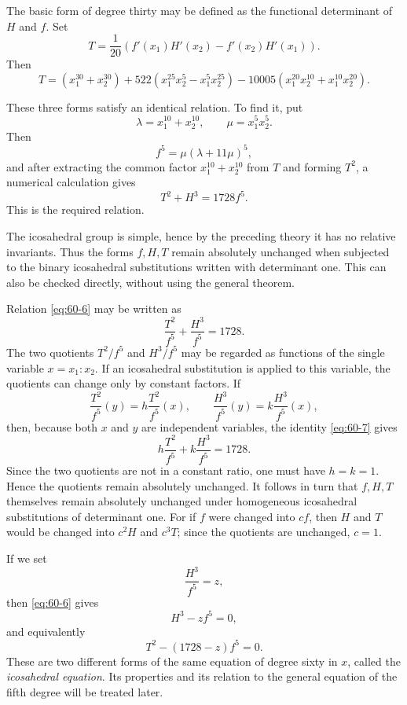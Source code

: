 \documentclass[11pt,a4paper]{article}
\begin{document}
The basic form of degree thirty may be defined as the functional determinant of \(H\) and \(f\).  Set
\begin{equation}\label{eq:60-4}
 T=\frac1{20}\left(f'(x_1)H'(x_2)-f'(x_2)H'(x_1)\right).
\end{equation}
Then
\begin{equation}\label{eq:60-5}
 T=(x_1^{30}+x_2^{30})+522(x_1^{25}x_2^5-x_1^5x_2^{25})-10005(x_1^{20}x_2^{10}+x_1^{10}x_2^{20}).
\end{equation}

These three forms satisfy an identical relation.  To find it, put
\[
 \lambda=x_1^{10}+x_2^{10},
 \qquad
 \mu=x_1^5x_2^5.
\]
Then
\[
 f^5=\mu(\lambda+11\mu)^5,
\]
and after extracting the common factor \(x_1^{10}+x_2^{10}\) from \(T\) and forming \(T^2\), a numerical calculation gives
\begin{equation}\label{eq:60-6}
 T^2+H^3=1728f^5.
\end{equation}
This is the required relation.

The icosahedral group is simple, hence by the preceding theory it has no relative invariants.  Thus the forms \(f,H,T\) remain absolutely unchanged when subjected to the binary icosahedral substitutions written with determinant one.  This can also be checked directly, without using the general theorem.

Relation \eqref{eq:60-6} may be written as
\begin{equation}\label{eq:60-7}
 \frac{T^2}{f^5}+\frac{H^3}{f^5}=1728.
\end{equation}
The two quotients \(T^2/f^5\) and \(H^3/f^5\) may be regarded as functions of the single variable \(x=x_1:x_2\).  If an icosahedral substitution is applied to this variable, the quotients can change only by constant factors.  If
\[
 \frac{T^2}{f^5}(y)=h\frac{T^2}{f^5}(x),
 \qquad
 \frac{H^3}{f^5}(y)=k\frac{H^3}{f^5}(x),
\]
then, because both \(x\) and \(y\) are independent variables, the identity \eqref{eq:60-7} gives
\[
 h\frac{T^2}{f^5}+k\frac{H^3}{f^5}=1728.
\]
Since the two quotients are not in a constant ratio, one must have \(h=k=1\).  Hence the quotients remain absolutely unchanged.  It follows in turn that \(f,H,T\) themselves remain absolutely unchanged under homogeneous icosahedral substitutions of determinant one.  For if \(f\) were changed into \(cf\), then \(H\) and \(T\) would be changed into \(c^2H\) and \(c^3T\); since the quotients are unchanged, \(c=1\).

If we set
\[
 \frac{H^3}{f^5}=z,
\]
then \eqref{eq:60-6} gives
\begin{equation}\label{eq:60-9}
 H^3-zf^5=0,
\end{equation}
and equivalently
\begin{equation}\label{eq:60-10}
 T^2-(1728-z)f^5=0.
\end{equation}
These are two different forms of the same equation of degree sixty in \(x\), called the \emph{icosahedral equation}.  Its properties and its relation to the general equation of the fifth degree will be treated later.
\end{document}
